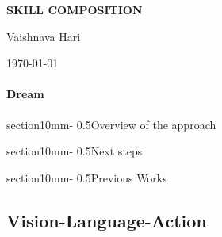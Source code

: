 \documentclass[11pt,a4paper]{article}
\makeatletter
\renewcommand{\section}{\@startsection%
{section}{1}{0mm}{-\baselineskip}%
{0.5\baselineskip}{\normalfont\Large\bfseries}}%
\makeatother
\begin{document}
\pagestyle{plain}



\begin{center} 
\bfseries\uppercase{Skill composition}
\end{center}
\vspace{-0.3cm}
\centerline{{Vaishnava Hari}}
\centerline{\today}


\paragraph{Dream}
    

\section{Overview of the approach}
    

\section{Next steps}
    

\section{Previous Works}

    \subsection{Vision-Language-Action}
        

%     

%     

%     



\end{document}
